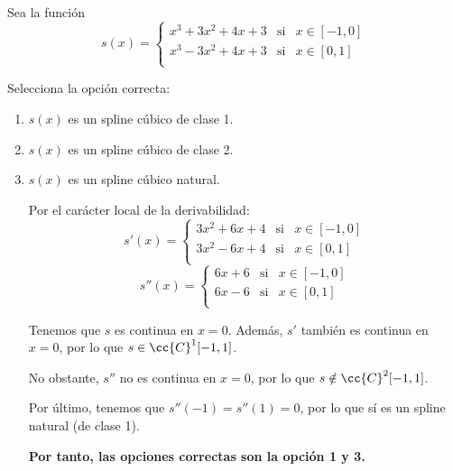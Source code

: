 \begin{ejercicio}
    Sea la función
    \begin{equation*}
        s(x)=\left\{\begin{array}{lll}
            x^3 + 3x^2 + 4x + 3 & \text{si} & x\in [-1, 0]\\
            x^3 - 3x^2 + 4x + 3 & \text{si} & x\in [0, 1]\\
        \end{array} \right.
    \end{equation*}

    Selecciona la opción correcta:
    \begin{enumerate}
        \item $s(x)$ es un spline cúbico de clase 1.
        \item $s(x)$ es un spline cúbico de clase 2.
        \item $s(x)$ es un spline cúbico natural.

        Por el carácter local de la derivabilidad:
        \begin{equation*}
            s'(x)=\left\{\begin{array}{lll}
                3x^2 + 6x + 4 & \text{si} & x\in [-1, 0]\\
                3x^2 - 6x + 4 & \text{si} & x\in [0, 1]\\
            \end{array} \right.
        \end{equation*}
        \begin{equation*}
            s''(x)=\left\{\begin{array}{lll}
                6x + 6 & \text{si} & x\in [-1, 0]\\
                6x - 6 & \text{si} & x\in [0, 1]\\
            \end{array} \right.
        \end{equation*}

        Tenemos que $s$ es continua en $x=0$. Además, $s'$ también es continua en $x=0$, por lo que $s\in \cc{C}^1[-1, 1]$.

        No obstante, $s''$ no es continua en $x=0$, por lo que $s\notin \cc{C}^2[-1, 1]$.

        Por último, tenemos que $s''(-1)=s''(1)=0$, por lo que sí es un spline natural (de clase 1).

        \textbf{Por tanto, las opciones correctas son la opción 1 y 3.}
    \end{enumerate}
\end{ejercicio}

